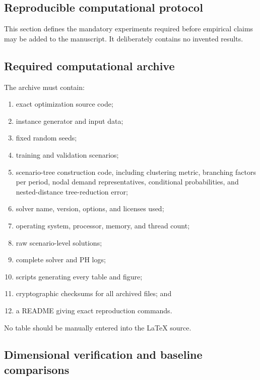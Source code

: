 \documentclass[11pt,a4paper]{article}
\begin{document}
\subsection{Reproducible computational protocol}
\label{sec:protocol}

This section defines the mandatory experiments required before empirical
claims may be added to the manuscript. It deliberately contains no
invented results.

\subsection{Required computational archive}

The archive must contain:
\begin{enumerate}
  \item exact optimization source code;
  \item instance generator and input data;
  \item fixed random seeds;
  \item training and validation scenarios;
  \item scenario-tree construction code, including clustering metric,
  branching factors per period, nodal demand representatives, conditional
  probabilities, and nested-distance tree-reduction error;
  \item solver name, version, options, and licenses used;
  \item operating system, processor, memory, and thread count;
  \item raw scenario-level solutions;
  \item complete solver and PH logs;
  \item scripts generating every table and figure;
  \item cryptographic checksums for all archived files; and
  \item a README giving exact reproduction commands.
\end{enumerate}
No table should be manually entered into the \LaTeX{} source.

\subsection{Dimensional verification and baseline comparisons}
\end{document}
